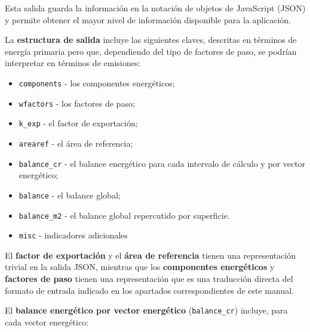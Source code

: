 \documentclass[10pt,notitlepage,oneside,a4paper]{article}
\begin{document}
Esta salida guarda la información en la notación de objetos de JavaScript (JSON) y permite obtener el mayor nivel de información disponible para la aplicación.

La \textbf{estructura de salida} incluye las siguientes claves, descritas en términos de energía primaria pero que, dependiendo del tipo de factores de paso, se podrían interpretar en términos de emisiones:

\begin{itemize}
\item \texttt{components} - los componentes energéticos;
\item \texttt{wfactors} - los factores de paso;
\item \texttt{k\_exp} - el factor de exportación;
\item \texttt{arearef} - el área de referencia;
\item \texttt{balance\_cr} - el balance energético para cada intervalo de cálculo y por vector energético;
\item \texttt{balance} - el balance global;
\item \texttt{balance\_m2} - el balance global repercutido por superficie.
\item \texttt{misc} - indicadores adicionales
\end{itemize}

El \textbf{factor de exportación} y el \textbf{área de referencia} tienen una representación trivial en la salida JSON, mientras que los \textbf{componentes energéticos} y \textbf{factores de paso} tienen una representación que es una traducción directa del formato de entrada indicado en los apartados correspondientes de este manual.

El \textbf{balance energético por vector energético} (\texttt{balance\_cr}) incluye, para cada vector energético:
\end{document}
